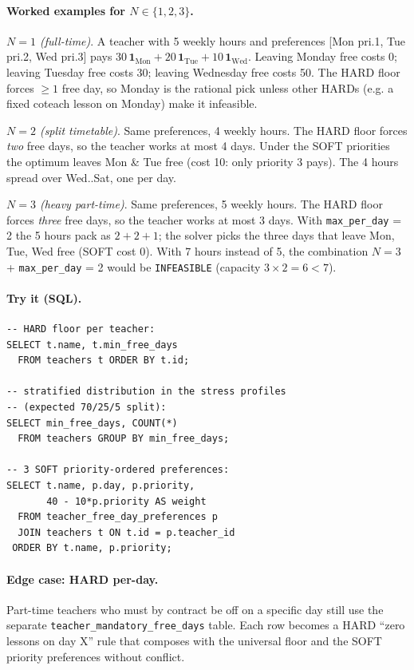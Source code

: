 \paragraph{Worked examples for $N \in \{1, 2, 3\}$.}

\textit{$N = 1$ (full-time)}. A teacher with 5 weekly hours
and preferences [Mon pri.1, Tue pri.2, Wed pri.3] pays
$30\,\mathbf{1}_{\mathrm{Mon}} + 20\,\mathbf{1}_{\mathrm{Tue}} +
10\,\mathbf{1}_{\mathrm{Wed}}$. Leaving Monday free costs 0;
leaving Tuesday free costs 30; leaving Wednesday free
costs 50. The HARD floor forces $\ge 1$ free day, so
Monday is the rational pick unless other HARDs (e.g. a
fixed coteach lesson on Monday) make it infeasible.

\textit{$N = 2$ (split timetable)}. Same preferences,
4 weekly hours. The HARD floor forces \emph{two} free
days, so the teacher works at most 4 days. Under the SOFT
priorities the optimum leaves Mon \& Tue free (cost 10:
only priority 3 pays). The 4 hours spread over Wed..Sat,
one per day.

\textit{$N = 3$ (heavy part-time)}. Same preferences,
5 weekly hours. The HARD floor forces \emph{three} free
days, so the teacher works at most 3 days. With
\texttt{max\_per\_day} = 2 the 5 hours pack as $2 + 2 + 1$;
the solver picks the three days that leave Mon, Tue, Wed
free (SOFT cost 0). With 7 hours instead of 5, the
combination $N = 3$ + \texttt{max\_per\_day} = 2 would be
\texttt{INFEASIBLE} (capacity $3 \times 2 = 6 < 7$).

\paragraph{Try it (SQL).}
\begin{verbatim}
-- HARD floor per teacher:
SELECT t.name, t.min_free_days
  FROM teachers t ORDER BY t.id;

-- stratified distribution in the stress profiles
-- (expected 70/25/5 split):
SELECT min_free_days, COUNT(*)
  FROM teachers GROUP BY min_free_days;

-- 3 SOFT priority-ordered preferences:
SELECT t.name, p.day, p.priority,
       40 - 10*p.priority AS weight
  FROM teacher_free_day_preferences p
  JOIN teachers t ON t.id = p.teacher_id
 ORDER BY t.name, p.priority;
\end{verbatim}

\paragraph{Edge case: HARD per-day.} Part-time teachers
who must by contract be off on a specific day still use
the separate \texttt{teacher\_mandatory\_free\_days} table.
Each row becomes a HARD ``zero lessons on day X'' rule
that composes with the universal floor and the SOFT
priority preferences without conflict.

